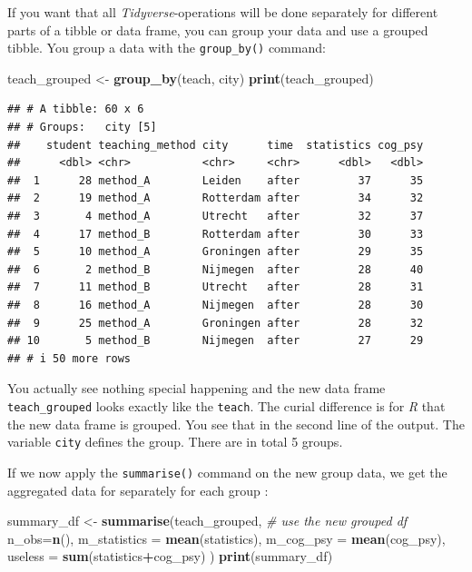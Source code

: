 \documentclass[
]{scrartcl}
\newenvironment{Shaded}{\begin{snugshade}}{\end{snugshade}}
\newcommand{\AttributeTok}[1]{\textcolor[rgb]{0.13,0.29,0.53}{#1}}
\newcommand{\CommentTok}[1]{\textcolor[rgb]{0.56,0.35,0.01}{\textit{#1}}}
\newcommand{\FunctionTok}[1]{\textcolor[rgb]{0.13,0.29,0.53}{\textbf{#1}}}
\newcommand{\NormalTok}[1]{#1}
\newcommand{\OtherTok}[1]{\textcolor[rgb]{0.56,0.35,0.01}{#1}}
\newcommand{\SpecialCharTok}[1]{\textcolor[rgb]{0.81,0.36,0.00}{\textbf{#1}}}
\begin{document}
If you want that all \emph{Tidyverse}-operations will be done separately for different parts of a tibble or data frame, you can group your data and use a grouped tibble. You group a data with the \texttt{group\_by()} command:

\begin{Shaded}
\begin{Highlighting}[]
\NormalTok{teach\_grouped }\OtherTok{\textless{}{-}} \FunctionTok{group\_by}\NormalTok{(teach, city)}
\FunctionTok{print}\NormalTok{(teach\_grouped)}
\end{Highlighting}
\end{Shaded}

\begin{verbatim}
## # A tibble: 60 x 6
## # Groups:   city [5]
##    student teaching_method city      time  statistics cog_psy
##      <dbl> <chr>           <chr>     <chr>      <dbl>   <dbl>
##  1      28 method_A        Leiden    after         37      35
##  2      19 method_A        Rotterdam after         34      32
##  3       4 method_A        Utrecht   after         32      37
##  4      17 method_B        Rotterdam after         30      33
##  5      10 method_A        Groningen after         29      35
##  6       2 method_B        Nijmegen  after         28      40
##  7      11 method_B        Utrecht   after         28      31
##  8      16 method_A        Nijmegen  after         28      30
##  9      25 method_A        Groningen after         28      32
## 10       5 method_B        Nijmegen  after         27      29
## # i 50 more rows
\end{verbatim}

You actually see nothing special happening and the new data frame \texttt{teach\_grouped} looks exactly like the \texttt{teach}. The curial difference is for \emph{R} that the new data frame is grouped. You see that in the second line of the output. The variable \texttt{city} defines the group. There are in total 5 groups.

If we now apply the \texttt{summarise()} command on the new group data, we get the aggregated data for separately for each group :

\begin{Shaded}
\begin{Highlighting}[]
\NormalTok{summary\_df }\OtherTok{\textless{}{-}} \FunctionTok{summarise}\NormalTok{(teach\_grouped,   }\CommentTok{\# use the new grouped df}
                \AttributeTok{n\_obs=}\FunctionTok{n}\NormalTok{(),}
                \AttributeTok{m\_statistics =} \FunctionTok{mean}\NormalTok{(statistics),}
                \AttributeTok{m\_cog\_psy =} \FunctionTok{mean}\NormalTok{(cog\_psy),}
                \AttributeTok{useless =} \FunctionTok{sum}\NormalTok{(statistics}\SpecialCharTok{+}\NormalTok{cog\_psy) )}
\FunctionTok{print}\NormalTok{(summary\_df)}
\end{Highlighting}
\end{Shaded}
\end{document}

